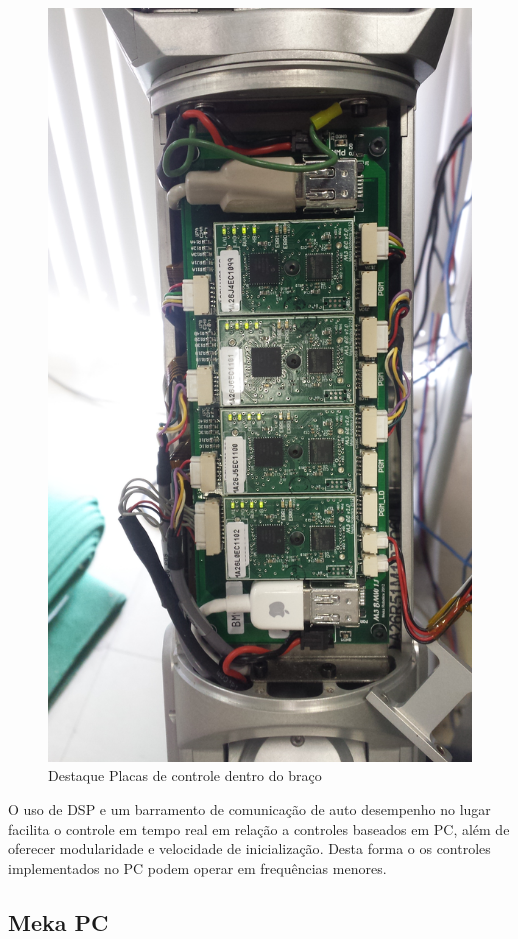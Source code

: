 \begin{figure}[H]
    \centering
    \includegraphics[width = 0.8\linewidth]{figs/dsp-control-wrist}
    \caption{Destaque Placas de controle dentro do braço \cite{nobody}}
    \label{fig:dsp-control-wrist}
\end{figure}

O uso de DSP e um barramento de comunicação de auto desempenho no lugar facilita o controle em tempo real em relação a controles baseados em PC, além de oferecer modularidade e velocidade de inicialização\cite{edsinger2004domo}. Desta forma o os controles implementados no PC podem operar em frequências menores.


\subsection{Meka PC}

